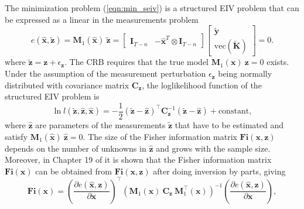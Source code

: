 The minimization problem (\ref{eqn:min_seiv}) is a structured EIV problem that can be expressed as a linear in the measurements problem \citep{Pintelon12Book}
\begin{equation} e (\widehat{\mathbf{x}}, \widetilde{\mathbf{z}}) = \mathbf{M}_1( \widehat{\mathbf{x}} ) \ \widetilde{\mathbf{z}} = \begin{bmatrix} \mathbf{I}_{T-n} & - \widehat{\mathbf{x}}^T \otimes \mathbf{I}_{T-n} \end{bmatrix} \begin{bmatrix} \widetilde{\mathbf{y}} \\ \mathrm{vec} ( \widetilde{\mathbf{K}} ) \end{bmatrix} = 0 . \label{eqn:M1vecyK} \end{equation}
where $\widetilde{\mathbf{z}} = \mathbf{z} + \epsilon_{\mathbf{z}}$.
The CRB requires that the true model $\mathbf{M}_1( \mathbf{x} ) \ \mathbf{z} = 0$ exists.
Under the assumption of the measurement perturbation $\epsilon_{\mathbf{z}}$ being normally distributed with covariance matrix $\mathbf{C}_{\mathbf{z}}$, the loglikelihood function of the structured EIV problem is
\begin{equation} \ln{ l(\widetilde{\mathbf{z}}, \widehat{\mathbf{z}}, \widehat{\mathbf{x}}) } = - \frac{1}{2} \left( \widetilde{\mathbf{z}} - \widehat{\mathbf{z}} \right)^\top \mathbf{C}_{\mathbf{z}}^{-1} \left( \widetilde{\mathbf{z}} - \widehat{\mathbf{z}} \right) + \mathrm{constant}, \end{equation}
where $\widehat{\mathbf{z}}$ are parameters of the measurements $\widetilde{\mathbf{z}}$ that have to be estimated and satisfy $\mathbf{M}_1( \widehat{\mathbf{x}} ) \ \widehat{\mathbf{z}} = 0$.
The size of the Fisher information matrix $\mathbf{Fi}(\mathbf{x}, \mathbf{z})$ depends on the number of unknowns in $\widehat{\mathbf{z}}$ and grows with the sample size.
Moreover, in Chapter 19 of \citep{Pintelon12Book} it is shown that the Fisher information matrix $\mathbf{Fi}(\mathbf{x})$ can be obtained from $\mathbf{Fi}(\mathbf{x}, \mathbf{z})$ after doing inversion by parts, giving
\begin{equation} \mathbf{Fi}(\mathbf{x}) = \left( \frac{\partial e (\widehat{\mathbf{x}}, \mathbf{z}) }{\partial \mathbf{x} } \right)^\top \left( \mathbf{M}_1( \mathbf{x} ) \ \mathbf{C}_{\mathbf{z}} \ \mathbf{M}_1^\top( \mathbf{x} ) \right)^{-1} \left( \frac{\partial e (\widehat{\mathbf{x}}, \mathbf{z}) }{\partial \mathbf{x} } \right) 
 , \label{eqn:FIM} \end{equation} 
